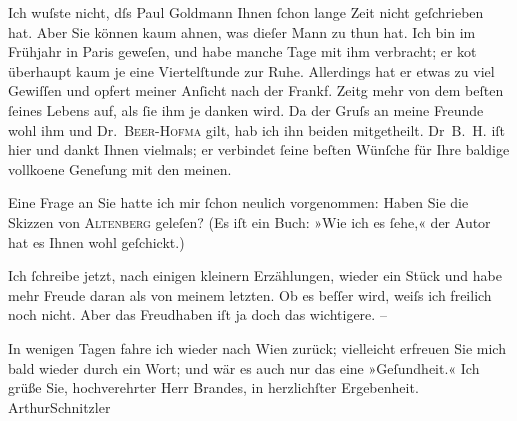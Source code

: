 \pstart
           Ich wuſste nicht, dſs Paul Goldmann Ihnen
               ſchon lange Zeit nicht geſchrieben hat. Aber Sie können kaum ahnen, was dieſer Mann
               zu thun hat. Ich bin im Frühjahr in Paris
               geweſen, und habe manche Tage mit ihm verbracht; er ko{\geminationm}t
               überhaupt kaum je eine Viertelſtunde zur Ruhe. Allerdings hat er etwas zu viel
               Gewiſſen und opfert meiner An{\pb}ſicht nach der Frankf. Zeitg mehr von dem beſten ſeines Lebens
               auf, als ſie ihm je danken wird. Da der Gruſs an meine Freunde wohl ihm und Dr. \textsc{Beer-Hofma{\geminationn}} gilt, hab ich ihn beiden mitgetheilt. Dr \textsc{B. H.} iſt hier und dankt Ihnen vielmals; er verbindet ſeine beſten Wünſche für Ihre
               baldige vollko{\geminationm}ene Geneſung mit den meinen.\pend
           
\pstart
           {\pb}Eine Frage an Sie hatte ich mir ſchon neulich
               vorgenommen: Haben Sie die Skizzen von \textsc{Altenberg} geleſen? (Es iſt ein Buch: »Wie ich es
                  ſehe,« der Autor hat es Ihnen wohl geſchickt.)\pend
           
\pstart
           Ich ſchreibe jetzt, nach einigen kleinern Erzählungen, wieder ein Stück und habe mehr
               Freude daran als von meinem letzten. Ob es beſſer wird,  weiſs ich freilich {\pb}noch nicht. Aber
               das Freudhaben iſt ja doch das wichtigere. –\pend
           
\pstart
           In wenigen Tagen fahre ich wieder nach Wien
               zurück; vielleicht erfreuen Sie mich bald wieder durch ein Wort; und wär es auch nur
               das eine »Geſundheit.«\pend
           \pstart Ich grüße Sie, hochverehrter Herr Brandes, in herzlichſter Ergebenheit.
                  \spacefill\mbox{ArthurSchnitzler}\pend{}\endnumbering{}  
      